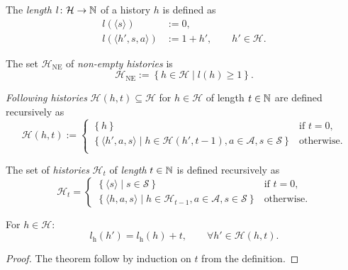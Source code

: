 \begin{definition} \label{def:hist-length}
The \emph{length} $l\colon \mathcal{H} \to \mathbb{N}$ of a history $h$ is defined as
\begin{align*}
l(\langle s \rangle) &:= 0, \\
l(\langle h', s, a \rangle) &:= 1 + h', \qquad h' \in \mathcal{H}. 
\end{align*}
\end{definition}

\begin{definition} \label{def:hist-ne}
The set $\mathcal{H}_{\mathrm{NE}}$ of \emph{non-empty histories} is
\[
\mathcal{H}_{\mathrm{NE}} := \left\{ h \in \mathcal{H} \mid  l(h) \ge 1 \right\}.
\]
 \leanok
\end{definition}

\begin{definition}\label{def:histories}
  \emph{Following histories} $\mathcal{H}(h,t) \subseteq \mathcal{H}$ for $h\in \mathcal{H}$ of length $t\in \mathbb{N}$ are defined recursively as
  \[
    \mathcal{H}(h,t) :=
    \begin{cases}
    \left\{  h \right\}  &\text{if } t = 0, \\
    \left\{  \langle h', a, s \rangle \mid h\in \mathcal{H}(h', t-1), a\in \mathcal{A}, s\in \mathcal{S}  \right\}  &\text{otherwise}. \\
    \end{cases}
  \]
\end{definition}

\begin{definition} \label{def:histories-horizon}
  The set of \emph{histories} $\mathcal{H}_{t}$ of \emph{length} $t \in \mathbb{N}$ is defined recursively as
  \[
    \mathcal{H}_t =
    \begin{cases}
      \left\{ \langle s \rangle \mid  s\in \mathcal{S} \right\} &\text{if } t = 0, \\
      \left\{ \langle h, a, s\rangle \mid h \in \mathcal{H}_{t-1}, a\in \mathcal{A}, s\in \mathcal{S} \right\} &\text{otherwise}.
    \end{cases}
  \]
   \leanok
\end{definition}

\begin{theorem} \label{thm:hist-lenth-eq-horizon}
  For $h \in \mathcal{H}$:
  \[
   l_{\mathrm{h}}(h') = l_{\mathrm{h}}(h) + t, \qquad \forall h'\in \mathcal{H}(h, t).
  \]
\end{theorem}
\begin{proof}
The theorem follow by induction on $t$ from the definition.  
\end{proof}

